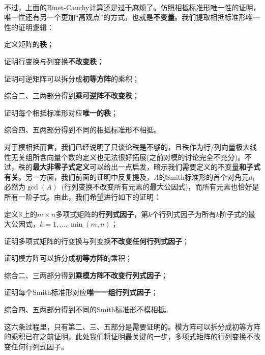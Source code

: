 \documentclass[a4paper,UTF8,fontset=windows,AutoFakeBold]{ctexart}
\begin{document}
\

不过，上面的Binet-Cauchy计算还是过于麻烦了。仿照相抵标准形唯一性的证明，唯一性还有另一个更加``高观点''的方式，也就是\textbf{不变量}。我们提取相抵标准形唯一性的证明逻辑：
\begin{compactitem}
    \item 定义矩阵的\textbf{秩}；
    \item 证明行变换与列变换\textbf{不改变秩}；
    \item 证明可逆矩阵可以拆分成\textbf{初等方阵}的乘积；
    \item 综合二、三两部分得到\textbf{乘可逆阵不改变秩}；
    \item 证明每个相抵标准形对应\textbf{唯一的秩}；
    \item 综合四、五两部分得到不同的相抵标准形不相抵。
\end{compactitem}

对于模相抵而言，我们已经说明了只谈论秩是不够的，且秩作为行/列向量极大线性无关组所含向量个数的定义也无法很好拓展(之前对模的讨论完全不充分)。不过，秩的\textbf{最大非零子式定义}可以给出一点启发，暗示我们需要定义的不变量\textbf{和子式有关}。另一方面，我们前面的证明中反复提及，$A$的Smith标准形的首个对角元$d_1$必然为$\gcd(A)$\ (行列变换不改变所有元素的最大公因式)，而所有元素也恰好是所有一阶子式。由此，我们希望进行如下的证明：
\begin{compactitem}
    \item 定义$\mathbb{K}$上的$m\times n$多项式矩阵的\textbf{行列式因子}，第$k$个行列式因子为所有$k$阶子式的最大公因式，$k=1,\dots,\min(m,n)$；
    \item 证明多项式矩阵的行变换与列变换\textbf{不改变任何行列式因子}；
    \item 证明模方阵可以拆分成\textbf{初等方阵}的乘积；
    \item 综合二、三两部分得到\textbf{乘模方阵不改变行列式因子}；
    \item 证明每个Smith标准形对应\textbf{唯一一组行列式因子}；
    \item 综合四、五两部分得到不同的Smith标准形不模相抵。
\end{compactitem}

这六条过程里，只有第二、三、五部分是需要证明的。模方阵可以拆分成初等方阵的乘积已在之前证明，此处我们将证明最关键的一步，多项式矩阵的行列变换不改变任何行列式因子。
\end{document}
